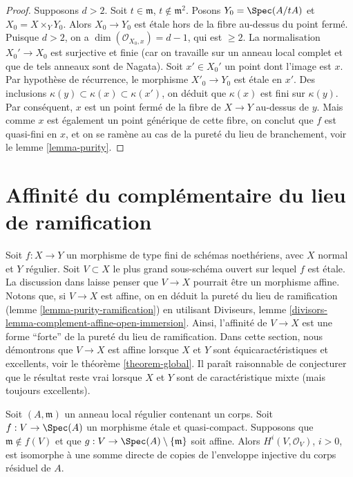 \begin{proof}
\medskip\noindent
Supposons $d > 2$. Soit $t \in \mathfrak m$, $t \not \in \mathfrak m^2$.
Posons $Y_0 = \Spec(A/tA)$ et $X_0 = X \times_Y Y_0$.
Alors $X_0 \to Y_0$ est \'etale hors de la fibre au-dessus du point fermé.
Puisque $d > 2$, on a $\dim(\mathcal{O}_{X_0, x}) = d - 1$, qui est $\geq 2$.
La normalisation $X_0' \to X_0$ est surjective et finie
(car on travaille sur un anneau local complet et que de tels anneaux sont de Nagata).
Soit $x' \in X_0'$ un point dont l'image est $x$. Par hypothèse de récurrence, le
morphisme $X'_0 \to Y_0$ est \'etale en $x'$. Des inclusions
$\kappa(y) \subset \kappa(x) \subset \kappa(x')$,
on déduit que $\kappa(x)$ est fini sur $\kappa(y)$.
Par conséquent, $x$ est un point fermé de la fibre de $X \to Y$
au-dessus de $y$. Mais comme $x$ est également un point générique de
cette fibre, on conclut que $f$ est quasi-fini en $x$,
et on se ramène au cas de la pureté du lieu de branchement, voir le
lemme \ref{lemma-purity}.
\end{proof}




\section{Affinité du complémentaire du lieu de ramification}
\label{section-stronger-purity}

\noindent
Soit $f : X \to Y$ un morphisme de type fini de schémas noethériens,
avec $X$ normal et $Y$ régulier. Soit $V \subset X$ le plus grand
sous-schéma ouvert sur lequel $f$ est \'etale.
La discussion dans \cite[chapitre IV, section 21.12]{EGA}
laisse penser que $V \to X$ pourrait être un morphisme affine.
Notons que, si $V \to X$ est affine, on en déduit la pureté du
lieu de ramification (lemme \ref{lemma-purity-ramification}) en
utilisant Diviseurs, lemme \ref{divisors-lemma-complement-affine-open-immersion}.
Ainsi, l'affinité de $V \to X$ est une forme ``forte'' de la pureté
du lieu de ramification.
Dans cette section, nous démontrons que $V \to X$ est affine lorsque
$X$ et $Y$ sont équicaractéristiques et excellents, voir le
théorème \ref{theorem-global}. Il paraît raisonnable
de conjecturer que le résultat reste vrai lorsque $X$ et $Y$ sont
de caractéristique mixte (mais toujours excellents).

\begin{lemma}
\label{lemma-structure-cohomology}
Soit $(A, \mathfrak m)$ un anneau local régulier contenant un corps.
Soit $f : V \to \Spec(A)$ un morphisme \'etale et quasi-compact.
Supposons que $\mathfrak m \not \in f(V)$ et que
$g : V \to \Spec(A) \setminus \{\mathfrak m\}$ soit affine.
Alors $H^i(V, \mathcal{O}_V)$, $i > 0$, est isomorphe à une somme
directe de copies de l'enveloppe injective du corps résiduel de $A$.
\end{lemma}

